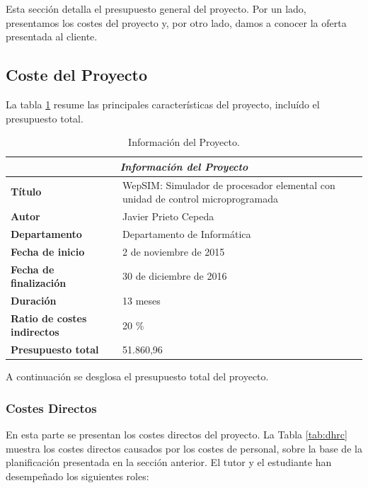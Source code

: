 Esta sección detalla el presupuesto general del proyecto. Por un lado, presentamos los costes del proyecto y, por otro lado, damos a conocer la oferta presentada al cliente.

\subsection{Coste del Proyecto}

La tabla \ref{tab:project_information} resume las principales características del proyecto, incluído el presupuesto total.

\begin{center}
\begin{table}[htbp]
\centering
\begin{tabular}{@{}p{3.5cm} p{9cm}@{}} 
\toprule
\multicolumn{2}{c}{\textbf{\textit{Información del Proyecto}}}\\
\midrule
\textbf{Título} 					& WepSIM: Simulador de procesador elemental con unidad de control microprogramada \\
\midrule
\textbf{Autor} 					& Javier Prieto Cepeda \\
\midrule
\textbf{Departamento} 				& Departamento de Informática \\
\midrule
\textbf{Fecha de inicio}				&2 de noviembre de 2015 \\
\midrule
\textbf{Fecha de finalización}				& 30 de diciembre de 2016 \\
\midrule
\textbf{Duración} 				& 13 meses \\
\midrule
\textbf{Ratio de costes indirectos} 	& 20 \% \\
\midrule
\textbf{Presupuesto total} 			& 51.860,96 \\
\bottomrule
\end{tabular}
\caption{Información del Proyecto.}
\label{tab:project_information}
\end{table}
\end{center}

\vspace{5cm}

A continuación se desglosa el presupuesto total del proyecto.

\subsubsection{Costes Directos}

En esta parte se presentan los costes directos del proyecto. La Tabla \ref{tab:dhrc} muestra los costes directos causados por los costes de personal, sobre la base de la planificación presentada en la sección anterior. El tutor y el estudiante han desempeñado los siguientes roles:

